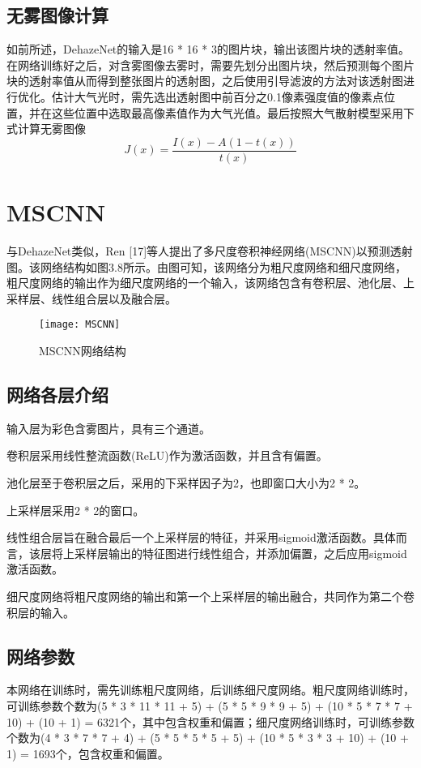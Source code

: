 \documentclass[a4paper, 12pt]{report}
\begin{document}
\subsection{无雾图像计算\quad}
如前所述，DehazeNet的输入是16 * 16 * 3的图片块，输出该图片块的透射率值。在网络训练好之后，对含雾图像去雾时，需要先划分出图片块，然后预测每个图片块的透射率值从而得到整张图片的透射图，之后使用引导滤波的方法对该透射图进行优化。估计大气光时，需先选出透射图中前百分之0.1像素强度值的像素点位置，并在这些位置中选取最高像素值作为大气光值。最后按照大气散射模型采用下式计算无雾图像
\begin{equation}
J(x) = \frac{I(x) - A(1 - t(x))}{t(x)}
\end{equation}

\section{MSCNN\quad}
与DehazeNet类似，Ren [17]等人提出了多尺度卷积神经网络(MSCNN)以预测透射图。该网络结构如图3.8所示。由图可知，该网络分为粗尺度网络和细尺度网络，粗尺度网络的输出作为细尺度网络的一个输入，该网络包含有卷积层、池化层、上采样层、线性组合层以及融合层。

\begin{figure}[H]
\centering
\texttt{[image: MSCNN]}
\caption{MSCNN网络结构}
\end{figure}

\subsection{网络各层介绍\quad}
	输入层为彩色含雾图片，具有三个通道。
\par 卷积层采用线性整流函数(ReLU)作为激活函数，并且含有偏置。
\par 池化层至于卷积层之后，采用的下采样因子为2，也即窗口大小为2 * 2。
\par 上采样层采用2 * 2的窗口。
\par 线性组合层旨在融合最后一个上采样层的特征，并采用sigmoid激活函数。具体而言，该层将上采样层输出的特征图进行线性组合，并添加偏置，之后应用sigmoid激活函数。
\par 细尺度网络将粗尺度网络的输出和第一个上采样层的输出融合，共同作为第二个卷积层的输入。

\subsection{网络参数\quad}
	本网络在训练时，需先训练粗尺度网络，后训练细尺度网络。粗尺度网络训练时，可训练参数个数为(5 * 3 * 11 * 11 + 5) + (5 * 5 * 9 * 9 + 5) + (10 * 5 * 7 * 7 + 10) + (10 + 1) = 6321个，其中包含权重和偏置；细尺度网络训练时，可训练参数个数为(4 * 3 * 7 * 7 + 4) + (5 * 5 * 5 * 5 + 5) + (10 * 5 * 3 * 3 + 10) + (10 + 1) = 1693个，包含权重和偏置。
\end{document}
